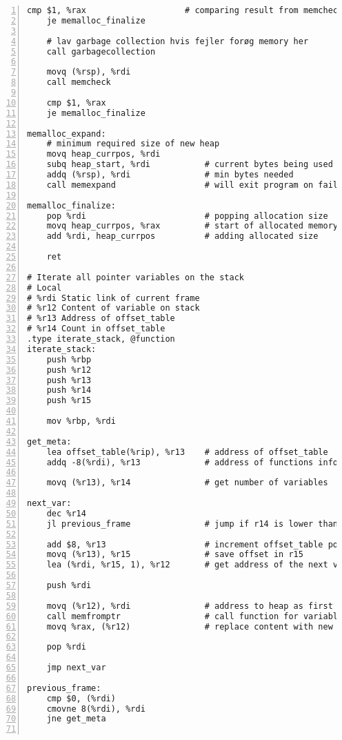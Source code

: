 \documentclass{article}
\begin{document}
\begin{lstlisting}[numbers=left, firstnumber=1]
	cmp $1, %rax					# comparing result from memcheck with true
	je memalloc_finalize

	# lav garbage collection hvis fejler forøg memory her
    call garbagecollection
    
    movq (%rsp), %rdi
    call memcheck
    
    cmp $1, %rax
    je memalloc_finalize    
    
memalloc_expand:
    # minimum required size of new heap
    movq heap_currpos, %rdi
    subq heap_start, %rdi           # current bytes being used
    addq (%rsp), %rdi               # min bytes needed
	call memexpand         			# will exit program on failure 

memalloc_finalize: 
	pop %rdi						# popping allocation size
	movq heap_currpos, %rax			# start of allocated memory, this value will be returned
	add %rdi, heap_currpos 			# adding allocated size 

	ret

# Iterate all pointer variables on the stack
# Local
# %rdi Static link of current frame
# %r12 Content of variable on stack
# %r13 Address of offset_table
# %r14 Count in offset_table
.type iterate_stack, @function
iterate_stack:
    push %rbp
    push %r12
    push %r13
    push %r14
    push %r15

    mov %rbp, %rdi
    
get_meta:
    lea offset_table(%rip), %r13    # address of offset_table
    addq -8(%rdi), %r13             # address of functions info

    movq (%r13), %r14               # get number of variables

next_var:
    dec %r14
    jl previous_frame               # jump if r14 is lower than 0

    add $8, %r13                    # increment offset_table pointer
    movq (%r13), %r15               # save offset in r15 
    lea (%rdi, %r15, 1), %r12       # get address of the next variable

    push %rdi
    
    movq (%r12), %rdi               # address to heap as first argument    
    call memfromptr                 # call function for variable
    movq %rax, (%r12)               # replace content with new address to heap
    
    pop %rdi    
    
    jmp next_var  

previous_frame:
    cmp $0, (%rdi)
    cmovne 8(%rdi), %rdi
    jne get_meta


\end{lstlisting}
\end{document}
